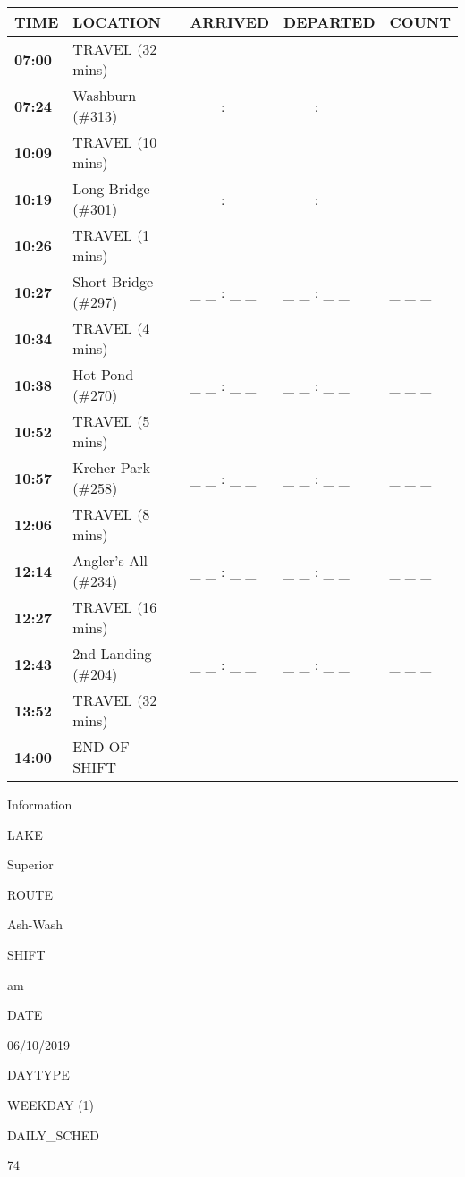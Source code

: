 \documentclass[]{article}
\begin{document}
\begin{tabular}{>{\bfseries}lllll}
\toprule
\textbf{TIME} & \textbf{LOCATION} & \textbf{ARRIVED} & \textbf{DEPARTED} & \textbf{COUNT}\\
\midrule
07:00 & TRAVEL (32 mins) &  &  & \\
07:24 & Washburn (\#313) & \_ \_ : \_ \_ & \_ \_ : \_ \_ & \_ \_ \_\\
10:09 & TRAVEL (10 mins) &  &  & \\
10:19 & Long Bridge (\#301) & \_ \_ : \_ \_ & \_ \_ : \_ \_ & \_ \_ \_\\
10:26 & TRAVEL (1 mins) &  &  & \\
10:27 & Short Bridge (\#297) & \_ \_ : \_ \_ & \_ \_ : \_ \_ & \_ \_ \_\\
10:34 & TRAVEL (4 mins) &  &  & \\
10:38 & Hot Pond (\#270) & \_ \_ : \_ \_ & \_ \_ : \_ \_ & \_ \_ \_\\
10:52 & TRAVEL (5 mins) &  &  & \\
10:57 & Kreher Park (\#258) & \_ \_ : \_ \_ & \_ \_ : \_ \_ & \_ \_ \_\\
12:06 & TRAVEL (8 mins) &  &  & \\
12:14 & Angler's All (\#234) & \_ \_ : \_ \_ & \_ \_ : \_ \_ & \_ \_ \_\\
12:27 & TRAVEL (16 mins) &  &  & \\
12:43 & 2nd Landing (\#204) & \_ \_ : \_ \_ & \_ \_ : \_ \_ & \_ \_ \_\\
13:52 & TRAVEL (32 mins) &  &  & \\
14:00 & END OF SHIFT &  &  & \\
\bottomrule
\end{tabular}\newpage

Information

LAKE

Superior

ROUTE

Ash-Wash

SHIFT

am

DATE

06/10/2019

DAYTYPE

WEEKDAY (1)

DAILY\_SCHED

74

\vspace{24pt}
\end{document}
